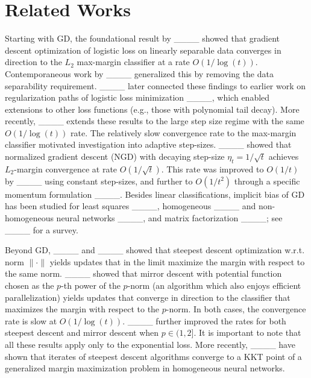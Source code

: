 \section{Related Works}
\label{sec:related work}
Starting with GD,  
the foundational result by ____ showed that gradient descent optimization of logistic loss on linearly separable data converges in direction to the $L_2$ max-margin classifier at a rate $O(1/\log(t))$. Contemporaneous work by ____ generalized this by removing the data separability requirement. ____ later connected these findings to earlier work on regularization paths of logistic loss minimization ____, which enabled extensions to other loss functions (e.g., those with polynomial tail decay). More recently, ____ extends these results to the large step size regime with the same $O(1/\log(t))$ rate. The relatively slow convergence rate to the max-margin classifier motivated investigation into adaptive step-sizes. ____ showed that normalized gradient descent (NGD) with decaying step-size $\eta_t=1/\sqrt{t}$ achieves $L_2$-margin convergence at rate $O(1/\sqrt{t})$. This rate was improved to $O(1/t)$ by ____ using constant step-sizes, and further to $O(1/t^2)$ through a specific momentum formulation ____. Besides linear classifications, implicit bias of GD has been studied for least squares ____, homogeneous  ____ and non-homogeneous neural networks ____, and matrix factorization ____; see ____ for a survey.

Beyond GD, ____ and ____ showed that steepest descent optimization w.r.t. norm  $\|\cdot\|$ yields updates that in the limit maximize the margin with respect to the same norm.
____ showed that mirror descent  with potential function chosen as the $p$-th power of the $p$-norm (an algorithm which also enjoys efficient parallelization) yields updates that converge in direction to the classifier that maximizes the margin with respect to the $p$-norm. In both  cases, the convergence rate  is slow at $O(1/\log(t))$. ____ further improved the rates for both steepest descent and mirror descent when $p \in (1,2]$. It is important to note that all these results apply only to the exponential loss. More recently, ____ have shown that iterates of steepest descent algorithms converge to a KKT point of a generalized margin maximization problem in homogeneous neural networks.

